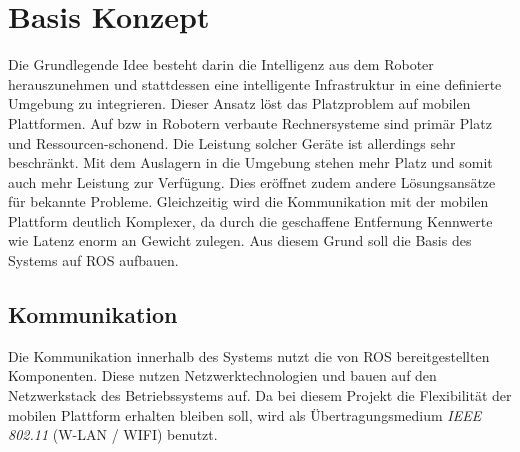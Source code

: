 \chapter{Basis Konzept}
Die Grundlegende Idee besteht darin die Intelligenz aus dem Roboter herauszunehmen und stattdessen eine intelligente Infrastruktur in eine definierte Umgebung zu integrieren. Dieser Ansatz löst das Platzproblem auf mobilen Plattformen. Auf bzw in Robotern verbaute Rechnersysteme sind primär Platz und Ressourcen-schonend. Die Leistung solcher Geräte ist allerdings sehr beschränkt. Mit dem Auslagern in die Umgebung stehen mehr Platz und somit auch mehr Leistung zur Verfügung. Dies eröffnet zudem andere Lösungsansätze für bekannte Probleme. Gleichzeitig wird die Kommunikation mit der mobilen Plattform deutlich Komplexer, da durch die geschaffene Entfernung Kennwerte wie Latenz enorm an Gewicht zulegen. Aus diesem Grund soll die Basis des Systems auf ROS aufbauen. 

	\section{Kommunikation}
	Die Kommunikation innerhalb des Systems nutzt die von ROS bereitgestellten Komponenten. Diese nutzen Netzwerktechnologien und bauen auf den Netzwerkstack des Betriebssystems auf. Da bei diesem Projekt die Flexibilität der mobilen Plattform erhalten bleiben soll, wird als Übertragungsmedium \textit{IEEE 802.11} (W-LAN / WIFI) benutzt.

